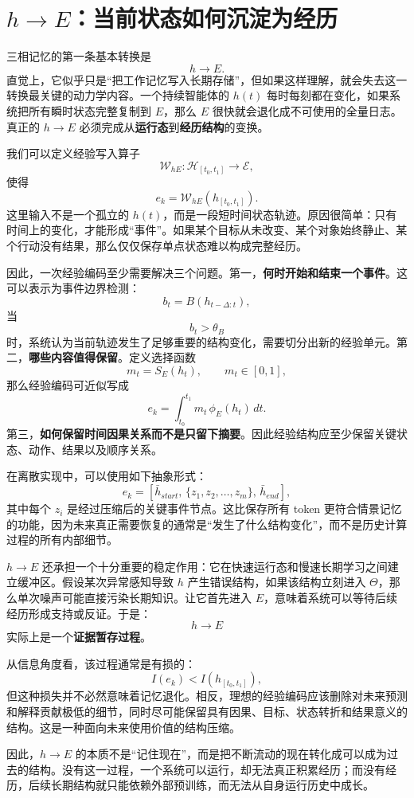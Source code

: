 \section{$h\rightarrow E$：当前状态如何沉淀为经历}

三相记忆的第一条基本转换是
\[
\boxed{
h\rightarrow E.
}
\]
直觉上，它似乎只是“把工作记忆写入长期存储”，但如果这样理解，就会失去这一转换最关键的动力学内容。一个持续智能体的 $h(t)$ 每时每刻都在变化，如果系统把所有瞬时状态完整复制到 $E$，那么 $E$ 很快就会退化成不可使用的全量日志。真正的 $h\rightarrow E$ 必须完成从\textbf{运行态}到\textbf{经历结构}的变换。

我们可以定义经验写入算子
\[
\mathcal{W}_{hE}:
\mathcal H_{[t_0,t_1]}
\rightarrow
\mathcal E,
\]
使得
\[
e_k
=
\mathcal W_{hE}
\left(
h_{[t_0,t_1]}
\right).
\]
这里输入不是一个孤立的 $h(t)$，而是一段短时间状态轨迹。原因很简单：只有时间上的变化，才能形成“事件”。如果某个目标从未改变、某个对象始终静止、某个行动没有结果，那么仅仅保存单点状态难以构成完整经历。

因此，一次经验编码至少需要解决三个问题。第一，\textbf{何时开始和结束一个事件}。这可以表示为事件边界检测：
\[
b_t
=
B(h_{t-\Delta:t}),
\]
当
\[
b_t>\theta_B
\]
时，系统认为当前轨迹发生了足够重要的结构变化，需要切分出新的经验单元。第二，\textbf{哪些内容值得保留}。定义选择函数
\[
m_t
=
S_E(h_t),
\qquad
m_t\in[0,1],
\]
那么经验编码可近似写成
\[
e_k
=
\int_{t_0}^{t_1}
m_t\,\phi_E(h_t)\,dt.
\]
第三，\textbf{如何保留时间因果关系而不是只留下摘要}。因此经验结构应至少保留关键状态、动作、结果以及顺序关系。

在离散实现中，可以使用如下抽象形式：
\[
e_k
=
\left[
\bar h_{start},
\,
\{z_1,z_2,\ldots,z_m\},
\,
\bar h_{end}
\right],
\]
其中每个 $z_i$ 是经过压缩后的关键事件节点。这比保存所有 token 更符合情景记忆的功能，因为未来真正需要恢复的通常是“发生了什么结构变化”，而不是历史计算过程的所有内部细节。

$h\rightarrow E$ 还承担一个十分重要的稳定作用：它在快速运行态和慢速长期学习之间建立缓冲区。假设某次异常感知导致 $h$ 产生错误结构，如果该结构立刻进入 $\Theta$，那么单次噪声可能直接污染长期知识。让它首先进入 $E$，意味着系统可以等待后续经历形成支持或反证。于是：
\[
h\rightarrow E
\]
实际上是一个\textbf{证据暂存过程}。

从信息角度看，该过程通常是有损的：
\[
I(e_k)
<
I\left(
h_{[t_0,t_1]}
\right),
\]
但这种损失并不必然意味着记忆退化。相反，理想的经验编码应该删除对未来预测和解释贡献极低的细节，同时尽可能保留具有因果、目标、状态转折和结果意义的结构。这是一种面向未来使用价值的结构压缩。

因此，$h\rightarrow E$ 的本质不是“记住现在”，而是把不断流动的现在转化成可以成为过去的结构。没有这一过程，一个系统可以运行，却无法真正积累经历；而没有经历，后续长期结构就只能依赖外部预训练，而无法从自身运行历史中成长。

